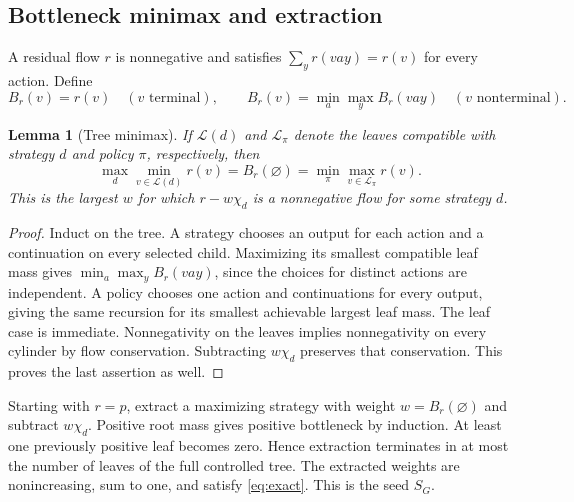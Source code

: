 \documentclass[11pt,a4paper]{article}
\newtheorem{lemma}[theorem]{Lemma}
\theoremstyle{definition}\newtheorem{definition}[theorem]{Definition}
\theoremstyle{remark}\newtheorem{remark}[theorem]{Remark}
\numberwithin{equation}{section}
\begin{document}
\subsection{Bottleneck minimax and extraction}
A residual flow $r$ is nonnegative and satisfies
$\sum_y r(vay)=r(v)$ for every action. Define
\[
 B_r(v)=r(v)\quad(v\text{ terminal}),\qquad
 B_r(v)=\min_a\max_y B_r(vay)\quad(v\text{ nonterminal}).
\]
\begin{lemma}[Tree minimax]\label{lem:minimax}
If $\mathcal L(d)$ and $\mathcal L_\pi$ denote the leaves compatible with
strategy $d$ and policy $\pi$, respectively, then
\[
 \max_d\min_{v\in\mathcal L(d)}r(v)
 =B_r(\varnothing)
 =\min_\pi\max_{v\in\mathcal L_\pi}r(v).
\]
This is the largest $w$ for which $r-w\chi_d$ is a nonnegative flow for
some strategy $d$.
\end{lemma}
\begin{proof}
Induct on the tree. A strategy chooses an output for each action and a
continuation on every selected child. Maximizing its smallest compatible
leaf mass gives $\min_a\max_y B_r(vay)$, since the choices for distinct
actions are independent. A policy chooses one action and continuations
for every output, giving the same recursion for its smallest achievable
largest leaf mass. The leaf case is immediate. Nonnegativity on the
leaves implies nonnegativity on every cylinder by flow conservation.
Subtracting $w\chi_d$ preserves that conservation. This proves the last
assertion as well.
\end{proof}
Starting with $r=p$, extract a maximizing strategy with weight
$w=B_r(\varnothing)$ and subtract $w\chi_d$. Positive root mass gives
positive bottleneck by induction. At least one previously positive leaf
becomes zero. Hence extraction terminates in at most the number of leaves
of the full controlled tree. The extracted weights are nonincreasing,
sum to one, and satisfy \eqref{eq:exact}. This is the seed $S_G$.
\end{document}
